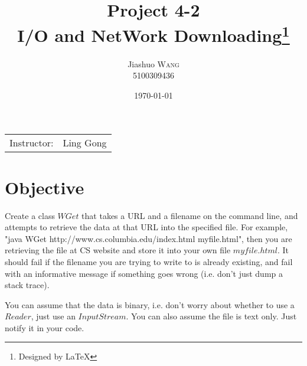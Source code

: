 \documentclass{article}
\title{Project 4-2 \\ I/O and NetWork Downloading\thanks{Designed by \LaTeX}} %
\author{Jiashuo \textsc{Wang} \\ 5100309436} %
\date{\today} %
\begin{document}
\maketitle %
\thispagestyle{fancy} %

\begin{center}
\begin{tabular}{l r}
Instructor: & Ling Gong %
\end{tabular}
\end{center}




\section{Objective}

Create a class $WGet$ that takes a URL and a filename on the command line, and attempts to retrieve the data at that URL into the specified file. For example, "java WGet http://www.cs.columbia.edu/index.html myfile.html", then you are retrieving the file at CS website and store it into your own file $myfile.html$.
It should fail if the filename you are trying to write to is already existing, and fail with an informative message if something goes wrong (i.e. don't just dump a stack trace).

You can assume that the data is binary, i.e. don't worry about whether to use a $Reader$, just use an $InputStream$. You can also assume the file is text only. Just notify it in your code.

\end{document}
